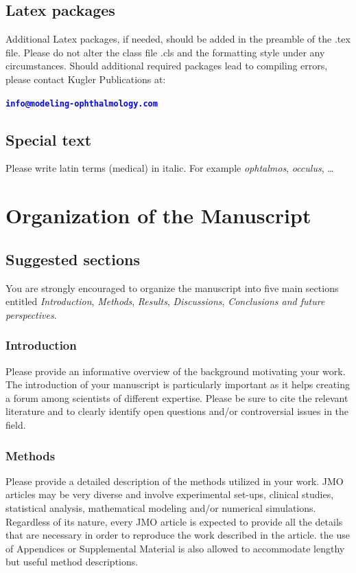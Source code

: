 \documentclass{jmoarticle}
\begin{document}
\subsection{Latex packages}
Additional Latex packages, if needed, should be added in the preamble of the
.tex file.  Please do not alter the class file .cls and the formatting style
under any circumstances.  Should additional required packages lead to compiling
errors, please contact Kugler Publications at:

\noindent
\begin{center}
\textbf{\textcolor{blue}{
\texttt{info@modeling-ophthalmology.com}
}}
\end{center}

\subsection{Special text}

Please write latin terms (medical) in italic. For example
\textit{ophtalmos}, \textit{occulus}, \ldots


\section{Organization of the Manuscript}

\subsection{Suggested sections}
You are strongly encouraged to organize the manuscript into five main sections
entitled \textit{Introduction}, \textit{Methods}, \textit{Results},
\textit{Discussions}, \textit{Conclusions and future perspectives}.

\subsubsection{Introduction}
Please provide an informative overview of the background motivating your work.
The introduction of your manuscript is particularly important as it helps
creating a forum among scientists of different expertise.  Please be sure to
cite the relevant literature and to clearly identify open questions and/or
controversial issues in the field.

\subsubsection{Methods}
Please provide a detailed description of the methods utilized in your work. JMO
articles may be very diverse and involve experimental set-ups, clinical
studies, statistical analysis, mathematical modeling and/or numerical
simulations.  Regardless of its nature, every JMO article is expected to
provide all the details that are necessary in order to reproduce the work
described in the article. the use of Appendices or Supplemental Material is
also allowed to accommodate lengthy but useful method descriptions.
\end{document}
